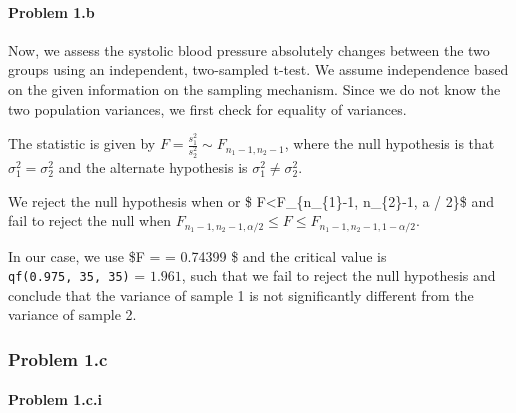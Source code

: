 \documentclass[
]{article}
\newenvironment{Shaded}{\begin{snugshade}}{\end{snugshade}}
\newcommand{\CommentTok}[1]{\textcolor[rgb]{0.56,0.35,0.01}{\textit{#1}}}
\newcommand{\DataTypeTok}[1]{\textcolor[rgb]{0.13,0.29,0.53}{#1}}
\newcommand{\DecValTok}[1]{\textcolor[rgb]{0.00,0.00,0.81}{#1}}
\newcommand{\FloatTok}[1]{\textcolor[rgb]{0.00,0.00,0.81}{#1}}
\newcommand{\KeywordTok}[1]{\textcolor[rgb]{0.13,0.29,0.53}{\textbf{#1}}}
\newcommand{\NormalTok}[1]{#1}
\newcommand{\OperatorTok}[1]{\textcolor[rgb]{0.81,0.36,0.00}{\textbf{#1}}}
\newcommand{\StringTok}[1]{\textcolor[rgb]{0.31,0.60,0.02}{#1}}
\begin{document}
\hypertarget{problem-1.b}{%
\paragraph{Problem 1.b}\label{problem-1.b}}

Now, we assess the systolic blood pressure absolutely changes between
the two groups using an independent, two-sampled t-test. We assume
independence based on the given information on the sampling mechanism.
Since we do not know the two population variances, we first check for
equality of variances.

The statistic is given by
\(F=\frac{s_{1}^{2}}{s_{2}^{2}} \sim F_{n_{1}-1, n_{2}-1}\), where the
null hypothesis is that \(\sigma^2_1 = \sigma^2_2\) and the alternate
hypothesis is \(\sigma^2_1\neq \sigma^2_2\).

We reject the null hypothesis when or \$ F\textless F\_\{n\_\{1\}-1,
n\_\{2\}-1, a / 2\}\$ and fail to reject the null when
\(F_{n_{1}-1, n_{2}-1, \alpha / 2} \leq F \leq F_{n_{1}-1, n_{2}-1,1-\alpha / 2}\).

In our case, we use \$F =  = 0.74399 \$ and the
critical value is \texttt{qf(0.975,\ 35,\ 35)} = \(1.961\), such that we
fail to reject the null hypothesis and conclude that the variance of
sample 1 is not significantly different from the variance of sample 2.

\hypertarget{problem-1.c}{%
\subsubsection{Problem 1.c}\label{problem-1.c}}

\hypertarget{problem-1.c.i}{%
\paragraph{Problem 1.c.i}\label{problem-1.c.i}}

\begin{Shaded}
\end{Shaded}
\end{document}
